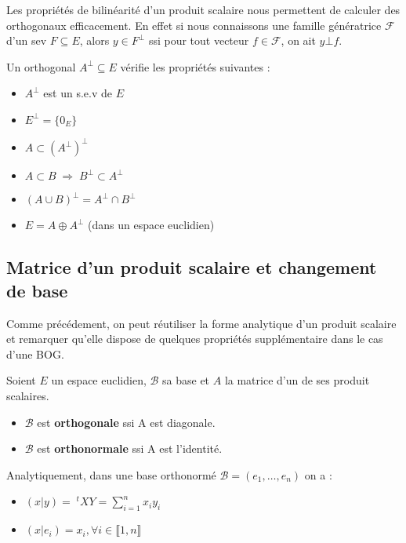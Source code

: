 \begin{remark}
    Les propriétés de bilinéarité d'un produit scalaire nous permettent de calculer des orthogonaux efficacement. 
    En effet si nous connaissons une famille génératrice $\mathcal{F}$ d'un sev $F \subseteq E$, alors $y \in F^\bot$ ssi 
    pour tout vecteur $f \in \mathcal{F}$, on ait $y \bot f$. 
\end{remark}

\newpage 

\begin{prop}[Orthogonal]
    Un orthogonal $A^\bot \subseteq E$ vérifie les propriétés suivantes : 
    \begin{itemize}
        \item $A^{\bot} $ est un s.e.v de $E$
        \item $E^{\bot} = \{ 0_E \} $
        \item $ A \subset (A^{\bot})^{\bot} $
        \item $ A \subset B \; \Longrightarrow \; B^{\bot} \subset A^{\bot} $
        \item $ (A \cup B)^{\bot} = A^\bot \cap B^\bot $
        \item $E = A \oplus A^\bot $ (dans un espace euclidien)
    \end{itemize}
\end{prop}

\subsection{Matrice d'un produit scalaire et changement de base}

Comme précédement, on peut réutiliser la forme analytique d'un produit scalaire et remarquer qu'elle dispose 
de quelques propriétés supplémentaire dans le cas d'une BOG. 

\begin{prop}
    Soient $E$ un espace euclidien, $\mathcal{B}$ sa base et $A$ la matrice d'un de ses produit scalaires. 
    \begin{itemize}
        \item $\mathcal{B}$ est \textbf{orthogonale} ssi A est diagonale. 
        \item $\mathcal{B}$ est \textbf{orthonormale} ssi A est l'identité. 
    \end{itemize}
    Analytiquement, dans une base orthonormé $\mathcal{B} = (e_1, \dots, e_n)$ on a :
    \begin{itemize}
        \item $(x|y) = \; ^tXY = \sum_{i=1}^{n} x_i y_i $ 
        \item $(x|e_i) = x_i, \forall i \in \llbracket 1, n \rrbracket $
    \end{itemize}
\end{prop}

